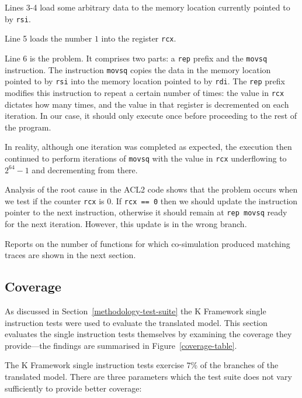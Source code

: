 \documentclass[a4paper,12pt,twoside,openright]{report}
\begin{document}
Lines 3-4 load some arbitrary data to the memory location currently pointed to by \texttt{rsi}.

Line 5 loads the number $1$ into the register \texttt{rcx}.

Line 6 is the problem.  It comprises two parts: a \texttt{rep} prefix and the \texttt{movsq} instruction.  The instruction \texttt{movsq} copies the data in the memory location pointed to by \texttt{rsi} into the memory location pointed to by \texttt{rdi}.  The \texttt{rep} prefix modifies this instruction to repeat a certain number of times: the value in \texttt{rcx} dictates how many times, and the value in that register is decremented on each iteration.  In our case, it should only execute once before proceeding to the rest of the program.

In reality, although one iteration was completed as expected, the execution then continued to perform iterations of \texttt{movsq} with the value in \texttt{rcx} underflowing to $2^{64} - 1$ and decrementing from there.

Analysis of the root cause in the ACL2 code shows that the problem occurs when we test if the counter \texttt{rcx} is $0$.  If \texttt{rcx == 0} then we should update the instruction pointer to the next instruction, otherwise it should remain at \texttt{rep movsq} ready for the next iteration.  However, this update is in the wrong branch.

Reports on the number of functions for which co-simulation produced matching traces are shown in the next section.

\subsection{Coverage}

As discussed in Section~\ref{methodology-test-suite} the K Framework single instruction tests were used to evaluate the translated model.  This section evaluates the single instruction tests themselves by examining the coverage they provide---the findings are summarised in Figure~\ref{coverage-table}.

The K Framework single instruction tests exercise $7\%$ of the branches of the translated model.  There are three parameters which the test suite does not vary sufficiently to provide better coverage:
\end{document}
